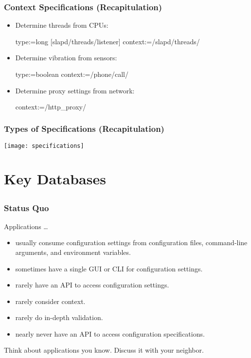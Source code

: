 \begin{frame}[fragile]
	\frametitle{Context Specifications (Recapitulation)}

	\begin{itemize}
	\item
	Determine threads from CPUs:

	\begin{code}
	  type:=long
	[slapd/threads/listener]
	  context:=/slapd/threads/%
	\end{code}

	\item
	Determine vibration from sensors:

	\begin{code}
	  type:=boolean
	  context:=/phone/call/%
	\end{code}

	\item
	Determine proxy settings from network:

	\begin{code}
	  context:=/http_proxy/%
	\end{code}
	\end{itemize}
\end{frame}


\begin{frame}
	\frametitle{Types of Specifications (Recapitulation)}
	\texttt{[image: specifications]}
\end{frame}


\section{Key Databases}

\subsection{}

\begin{frame}
	\frametitle{Status Quo}

	Applications \dots

	\begin{itemize}
	\item usually consume configuration settings from configuration files, command-line arguments, and environment variables.
	\item sometimes have a single GUI or CLI for configuration settings.
	\item rarely have an API to access configuration settings.
	\item rarely consider context.
	\item rarely do in-depth validation.
	\item nearly never have an API to access configuration specifications.
	\end{itemize}

	\begin{task}
	Think about applications you know.
	Discuss it with your neighbor.
	\end{task}
\end{frame}

